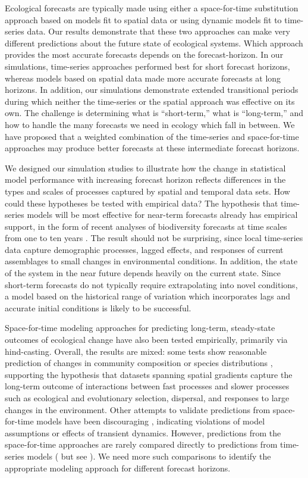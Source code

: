 \documentclass[11pt]{article}
\begin{document}
Ecological forecasts are typically made using either a space-for-time substitution approach based on models fit to spatial data or using dynamic models fit to time-series data. Our results demonstrate that these two approaches can make very different predictions about the future state of ecological systems. Which approach provides the most accurate forecasts depends on the forecast-horizon. In our simulations, time-series approaches performed best for short forecast horizons, whereas models based on spatial data made more accurate forecasts at long horizons. In addition, our simulations demonstrate extended transitional periods during which neither the time-series or the spatial approach was effective on its own. The challenge is determining what is ``short-term,'' what is ``long-term,'' and how to handle the many forecasts we need in ecology which fall in between. We have proposed that a weighted combination of the time-series and space-for-time approaches may produce better forecasts at these intermediate forecast horizons.

We designed our simulation studies to illustrate how the change in statistical model performance with increasing forecast horizon reflects differences in the types and scales of processes captured by spatial and temporal data sets. How could these hypotheses be tested with empirical data? The hypothesis that time-series models will be most effective for near-term forecasts already has empirical support, in the form of recent analyses of biodiversity forecasts at time scales from one to ten years \citep{harris_forecasting_2018}. The result should not be surprising, since local time-series data capture demographic processes, lagged effects, and responses of current assemblages to small changes in environmental conditions. In addition, the state of the system in the near future depends heavily on the current state. Since short-term forecasts do not typically require extrapolating into novel conditions, a model based on the historical range of variation which incorporates lags and accurate initial conditions is likely to be successful.

Space-for-time modeling approaches for predicting long-term, steady-state outcomes of ecological change have also been tested empirically, primarily via hind-casting. Overall, the results are mixed: some tests show reasonable prediction of changes in community composition \citep{Blois2013,Illan2014} or species distributions \citep{Norberg2019}, supporting the hypothesis that datasets spanning spatial gradients capture the long-term outcome of interactions between fast processes and slower processes such as ecological and evolutionary selection, dispersal, and responses to large changes in the environment. Other attempts to validate predictions from space-for-time models have been discouraging \citep{Worth2014,Illan2014,Davis2014,Brun2016,Veloz2012}, indicating violations of model assumptions or effects of transient dynamics. However, predictions from the space-for-time approaches are rarely compared directly to predictions from time-series models (\citealt{harris_forecasting_2018} but see \citealt{Renwick2018}). We need more such comparisons to identify the appropriate modeling approach for different forecast horizons. 
\end{document}
